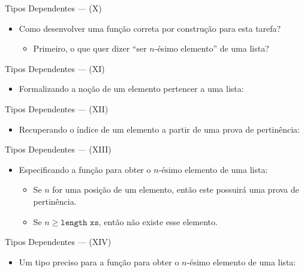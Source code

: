 \documentclass{beamer}
\begin{document}
       \begin{frame}{Tipos Dependentes --- (X)}
         \begin{itemize}
           \item Como desenvolver uma fun\c{c}\~ao correta por constru\c{c}\~ao para esta tarefa?
           \begin{itemize}
             \item Primeiro, o que quer dizer ``ser $n$-\'esimo elemento'' de uma lista?
           \end{itemize}
         \end{itemize}
       \end{frame}

       \begin{frame}{Tipos Dependentes --- (XI)}
         \begin{itemize}
           \item Formalizando a no\c{c}\~ao de um elemento pertencer a uma lista:
         \end{itemize}
       \end{frame}

       \begin{frame}{Tipos Dependentes --- (XII)}
         \begin{itemize}
           \item Recuperando o \'indice de um elemento a partir de uma prova de pertin\^encia:
         \end{itemize}
       \end{frame}

       \begin{frame}{Tipos Dependentes --- (XIII)}
         \begin{itemize}
           \item Especificando a fun\c{c}\~ao para obter o $n$-\'esimo elemento de uma lista:
           \begin{itemize}
             \item Se $n$ for uma posi\c{c}\~ao de um elemento, ent\~ao este possuir\'a uma prova de pertin\^encia.
             \item Se $n \geq \texttt{length xs}$, ent\~ao n\~ao existe esse elemento.
           \end{itemize}
         \end{itemize}
       \end{frame}

       \begin{frame}{Tipos Dependentes --- (XIV)}
         \begin{itemize}
           \item Um tipo preciso para a fun\c{c}\~ao para obter o $n$-\'esimo elemento de uma lista:
         \end{itemize}
       \end{frame}
\end{document}
